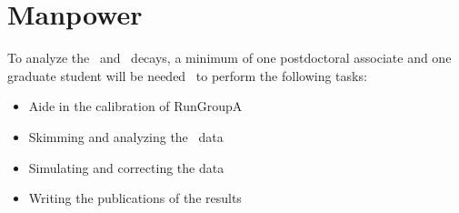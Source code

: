 \section{Manpower}\label{sec:manpower}
To analyze the \etaPDal \ and \phiDal \ decays, a minimum of one postdoctoral associate and one graduate student will be needed~ to perform the following tasks:
\begin{itemize}
	\item Aide in the calibration of RunGroupA
	\item Skimming and analyzing the \epemT \ data
	\item Simulating and correcting the data
	\item Writing the publications of the results
\end{itemize}
